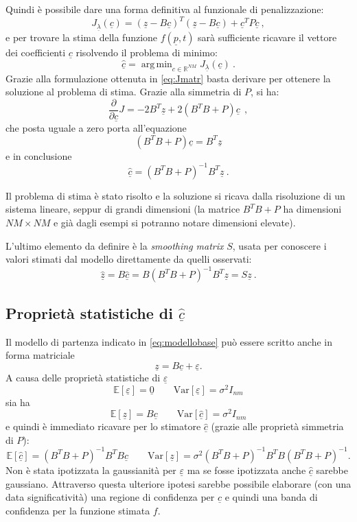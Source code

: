 \documentclass[a4paper,11pt,twoside,openright]{book}							%
\DeclareMathOperator*{\argmin}{arg\,min}
\begin{document}
Quindi è possibile dare una forma definitiva al funzionale di penalizzazione:
\begin{equation} 
\label{eq:Jmatr}
J_{\underline \lambda }(\underline c) = (\underline z - B \underline c)^T (\underline z - B \underline c) + \underline c^T P \underline c \ ,
\end{equation}
e per trovare la stima della funzione $f(\underline{p},t)$ sarà sufficiente ricavare il vettore dei coefficienti $\underline c$ risolvendo il problema di minimo:
$$
\hat{\underline{c}}=\argmin_{c \in \mathbb{R}^{NM}} J_{\underline \lambda }(\underline c) \ .
$$
Grazie alla formulazione ottenuta in \ref{eq:Jmatr} basta derivare per ottenere la soluzione al problema di stima. Grazie alla simmetria di $P$, si ha:
$$
\frac{\partial}{\partial \underline c}J= -2 B^T \underline z + 2(B^T B + P) \underline c \ \ ,
$$
che posta uguale a zero porta all'equazione
$$
(B^T B + P) \underline c = B^T\underline z
$$ 
e in conclusione
$$ \hat  {\underline c} = (B^T B + P)^{-1}B^T \underline z \ .$$

Il problema di stima è stato risolto e la soluzione si ricava dalla risoluzione di un sistema lineare, seppur di grandi dimensioni (la matrice $B^T B + P$ ha dimensioni $NM \times NM$ e già dagli esempi si potranno notare dimensioni elevate).

L'ultimo elemento da definire è la \textit{smoothing matrix} $S$, usata per conoscere i valori stimati dal modello direttamente da quelli osservati:
$$
\hat  {\underline z} =B\hat  {\underline c} = B(B^T B + P)^{-1}B^T \underline z = S\underline{z} \ .
$$



\subsection{Proprietà statistiche di $\hat  {\underline c}$}
Il modello di partenza indicato in \ref{eq:modellobase} può essere scritto anche in forma matriciale
\begin{equation}
\label{eq:modellobasematric}
\underline z=B \underline c + \underline \varepsilon .
\end{equation}
A causa delle proprietà statistiche di $\underline \varepsilon$
$$
\mathbb{E}[\underline \varepsilon] = \underline 0 \qquad \mathrm{Var}[\underline \varepsilon] = \sigma^2 I_{nm}
$$
sia ha
$$
\mathbb{E}[\underline z] = B \underline c \qquad \mathrm{Var}[\hat  {\underline c}] = \sigma^2 I_{nm}
$$
e quindi è immediato ricavare per lo stimatore $\hat  {\underline c}$ (grazie alle proprietà simmetria di $P$):
$$
\mathbb{E}[\hat  {\underline c}] = (B^T B + P)^{-1}B^TB \underline c \qquad \mathrm{Var}[\underline z] = \sigma^2 (B^T B + P)^{-1}B^TB(B^T B + P)^{-1} .
$$
Non è stata ipotizzata la gaussianità per $\underline \varepsilon$ ma se fosse ipotizzata anche $\hat  {\underline c}$ sarebbe gaussiano. Attraverso questa ulteriore ipotesi sarebbe possibile elaborare (con una data significatività) una regione di confidenza per $\hat  {\underline c}$ e quindi una banda di confidenza per la funzione stimata $f$.
\end{document}
